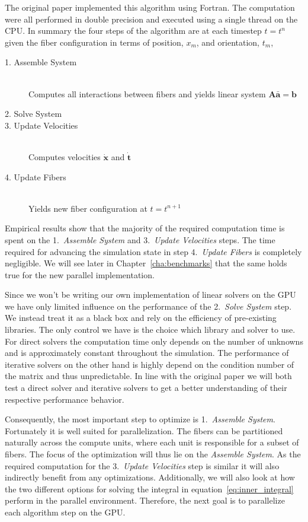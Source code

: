 The original paper implemented this algorithm using Fortran. The computation were all performed in double precision and executed using a single thread on the CPU. In summary the four steps of the algorithm are at each timestep $t=t^n$ given the fiber configuration in terms of position, $x_m$, and orientation, $t_m$, 
\begin{description}
  \item[1. Assemble System] \hfill \\
Computes all interactions between fibers and yields linear system $\mathbf{A}\mathbf{\bar{a}}=\mathbf{b}$
  \item[2. Solve System] 
  \item[3. Update Velocities] \hfill \\
Computes velocities $\mathbf{\dot{x}}$ and $\mathbf{\dot{t}}$
  \item[4. Update Fibers] \hfill \\
Yields new fiber configuration at $t=t^{n+1}$
\end{description}

Empirical results show that the majority of the required computation time is spent on the 1.~\emph{Assemble System} and 3.~\emph{Update Velocities} steps. The time required for advancing the simulation state in step 4.~\emph{Update Fibers} is completely negligible. We will see later in Chapter~\ref{cha:benchmarks} that the same holds true for the new parallel implementation.

Since we won't be writing our own implementation of linear solvers on the GPU we have only limited influence on the performance of the 2.~\emph{Solve System} step. We instead treat it as a black box and rely on the efficiency of pre-existing libraries. The only control we have is the choice which library and solver to use. For direct solvers the computation time only depends on the number of unknowns and is approximately constant throughout the simulation. The performance of iterative solvers on the other hand is highly depend on the condition number of the matrix and thus unpredictable. In line with the original paper we will both test a direct solver and iterative solvers to get a better understanding of their respective performance behavior.

Consequently, the most important step to optimize is 1.~\emph{Assemble System}. Fortunately it is well suited for parallelization. The fibers can be partitioned naturally across the compute units, where each unit is responsible for a subset of fibers. The focus of the optimization will thus lie on the \emph{Assemble System}. As the required computation for the 3.~\emph{Update Velocities} step is similar it will also indirectly benefit from any optimizations. Additionally, we will also look at how the two different options for solving the integral in equation~\ref{eq:inner_integral} perform in the parallel environment. Therefore, the next goal is to parallelize each algorithm step on the GPU.
